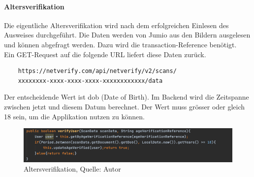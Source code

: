 \paragraph{Altersverifikation}
Die eigentliche Altersverifikation wird nach dem erfolgreichen Einlesen des Ausweises durchgeführt. Die Daten werden von Jumio aus den Bildern ausgelesen und können abgefragt werden. Dazu wird die transaction-Reference benötigt. \\
Ein GET-Request auf die folgende URL liefert diese Daten zurück. 
\begin{verbatim}
	https://netverify.com/api/netverify/v2/scans/
	xxxxxxxx-xxxx-xxxx-xxxx-xxxxxxxxxxxx/data
\end{verbatim}
Der entscheidende Wert ist dob (Date of Birth). Im Backend wird die Zeitspanne zwischen jetzt und diesem Datum berechnet. Der Wert muss grösser oder gleich 18 sein, um die Applikation nutzen zu können. 
 \begin{figure}[H]
	\centering
	\includegraphics[width=1\textwidth]{images/dob.PNG}
	\caption[Altersverifikation]{Altersverifikation, Quelle: Autor}
	\label{img: dob}
\end{figure} 
 
